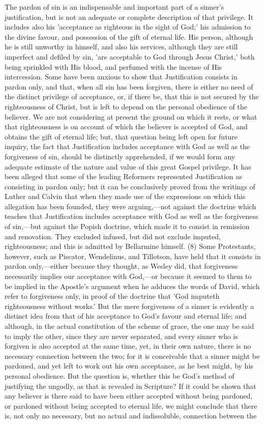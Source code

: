 \documentclass[
]{book}
\begin{document}
The pardon of sin is an indispensable and important part of a sinner's justification, but is not an adequate or complete description of that privilege. It includes also his 'acceptance as righteous in the sight of God;' his admission to the divine favour, and possession of the gift of eternal life. His person, although he is still unworthy in himself, and also his services, although they are still imperfect and defiled by sin, 'are acceptable to God through Jesus Christ,' both being sprinkled with His blood, and perfumed with the incense of His intercession. Some have been anxious to show that Justification consists in pardon only, and that, when all sin has been forgiven, there is either no need of the distinct privilege of acceptance, or, if there be, that this is not secured by the righteousness of Christ, but is left to depend on the personal obedience of the believer. We are not considering at present the ground on which it rests, or what that righteousness is on account of which the believer is accepted of God, and obtains the gift of eternal life; but, that question being left open for future inquiry, the fact that Justification includes acceptance with God as well as the forgiveness of sin, should be distinctly apprehended, if we would form any adequate estimate of the nature and value of this great Gospel privilege. It has been alleged that some of the leading Reformers represented Justification as consisting in pardon only; but it can be conclusively proved from the writings of Luther and Calvin that when they made use of the expressions on which this allegation has been founded, they were arguing,---not against the doctrine which teaches that Justification includes acceptance with God as well as the forgiveness of sin,---but against the Popish doctrine, which made it to consist in remission and renovation. They excluded infused, but did not exclude imputed, righteousness; and this is admitted by Bellarmine himself. (8) Some Protestants, however, such as Piscator, Wendelinus, and Tillotson, have held that it consists in pardon only,---either because they thought, as Wesley did, that forgiveness necessarily implies our acceptance with God,---or because it seemed to them to be implied in the Apostle's argument when he adduces the words of David, which refer to forgiveness only, in proof of the doctrine that 'God imputeth righteousness without works.' But the mere forgiveness of a sinner is evidently a distinct idea from that of his acceptance to God's favour and eternal life; and although, in the actual constitution of the scheme of grace, the one may be said to imply the other, since they are never separated, and every sinner who is forgiven is also accepted at the same time, yet, in their own nature, there is no necessary connection between the two; for it is conceivable that a sinner might be pardoned, and yet left to work out his own acceptance, as he best might, by his personal obedience. But the question is, whether this be God's method of justifying the ungodly, as that is revealed in Scripture? If it could be shown that any believer is there said to have been either accepted without being pardoned, or pardoned without being accepted to eternal life, we might conclude that there is, not only no necessary, but no actual and indissoluble, connection between the 
\end{document}

